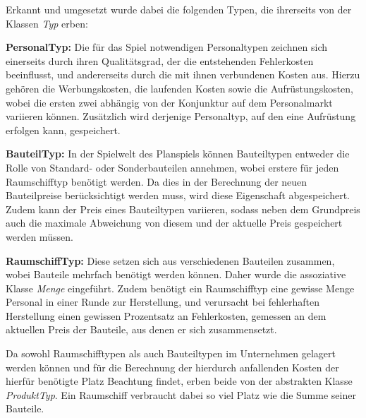 Erkannt und umgesetzt wurde dabei die folgenden Typen, die ihrerseits von der Klassen \textit{Typ} erben:
\begin{seList}
\item \textbf{PersonalTyp:} Die für das Spiel notwendigen Personaltypen zeichnen sich einerseits durch ihren Qualitätsgrad, der die entstehenden Fehlerkosten beeinflusst, und andererseits durch die mit ihnen verbundenen Kosten aus. Hierzu gehören die Werbungskosten, die laufenden Kosten sowie die Aufrüstungskosten, wobei die ersten zwei abhängig von der Konjunktur auf dem Personalmarkt variieren können. Zusätzlich wird derjenige Personaltyp, auf den eine Aufrüstung erfolgen kann, gespeichert.
\item \textbf{BauteilTyp:} In der Spielwelt des Planspiels können Bauteiltypen entweder die Rolle von Standard- oder Sonderbauteilen annehmen, wobei erstere für jeden Raumschifftyp benötigt werden. Da dies in der Berechnung der neuen Bauteilpreise berücksichtigt werden muss, wird diese Eigenschaft abgespeichert. Zudem kann der Preis eines Bauteiltypen variieren, sodass neben dem Grundpreis auch die maximale Abweichung von diesem und der aktuelle Preis gespeichert werden müssen.
\item \textbf{RaumschiffTyp:} Diese setzen sich aus verschiedenen Bauteilen zusammen, wobei Bauteile mehrfach benötigt werden können. Daher wurde die assoziative Klasse \textit{Menge} eingeführt. Zudem benötigt ein Raumschifftyp eine gewisse Menge Personal in einer Runde zur Herstellung, und verursacht bei fehlerhaften Herstellung einen gewissen Prozentsatz an Fehlerkosten, gemessen an dem aktuellen Preis der Bauteile, aus denen er sich zusammensetzt.
\end{seList}

Da sowohl Raumschifftypen als auch Bauteiltypen im Unternehmen gelagert werden können und für die Berechnung der hierdurch anfallenden Kosten der hierfür benötigte Platz Beachtung findet, erben beide von der abstrakten Klasse \textit{ProduktTyp}. Ein Raumschiff verbraucht dabei so viel Platz wie die Summe seiner Bauteile.

